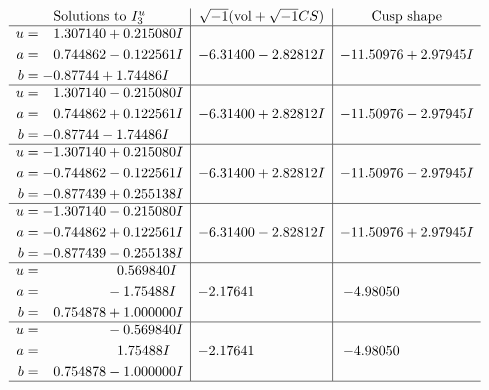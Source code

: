 \documentclass[1p]{elsarticle_modified}
\theoremstyle{definition}
\newcommand{\I}{\sqrt{-1}}
\begin{document}
$$\begin{array}{c|c|c}  
\text{Solutions to }I^u_{3}& \I (\text{vol} + \sqrt{-1}CS) & \text{Cusp shape}\\
 \hline 
\begin{aligned}
u &= \phantom{-}1.307140 + 0.215080 I \\
a &= \phantom{-}0.744862 - 0.122561 I \\
b &= -0.87744 + 1.74486 I\end{aligned}
 & -6.31400 - 2.82812 I & -11.50976 + 2.97945 I \\ \hline\begin{aligned}
u &= \phantom{-}1.307140 - 0.215080 I \\
a &= \phantom{-}0.744862 + 0.122561 I \\
b &= -0.87744 - 1.74486 I\end{aligned}
 & -6.31400 + 2.82812 I & -11.50976 - 2.97945 I \\ \hline\begin{aligned}
u &= -1.307140 + 0.215080 I \\
a &= -0.744862 - 0.122561 I \\
b &= -0.877439 + 0.255138 I\end{aligned}
 & -6.31400 + 2.82812 I & -11.50976 - 2.97945 I \\ \hline\begin{aligned}
u &= -1.307140 - 0.215080 I \\
a &= -0.744862 + 0.122561 I \\
b &= -0.877439 - 0.255138 I\end{aligned}
 & -6.31400 - 2.82812 I & -11.50976 + 2.97945 I \\ \hline\begin{aligned}
u &= \phantom{-0.000000 -}0.569840 I \\
a &= \phantom{-0.000000 } -1.75488 I \\
b &= \phantom{-}0.754878 + 1.000000 I\end{aligned}
 & -2.17641\phantom{ +0.000000I} & -4.98050\phantom{ +0.000000I} \\ \hline\begin{aligned}
u &= \phantom{-0.000000 } -0.569840 I \\
a &= \phantom{-0.000000 -}1.75488 I \\
b &= \phantom{-}0.754878 - 1.000000 I\end{aligned}
 & -2.17641\phantom{ +0.000000I} & -4.98050\phantom{ +0.000000I}\\
 \hline 
 \end{array}$$\newpage
\end{document}
